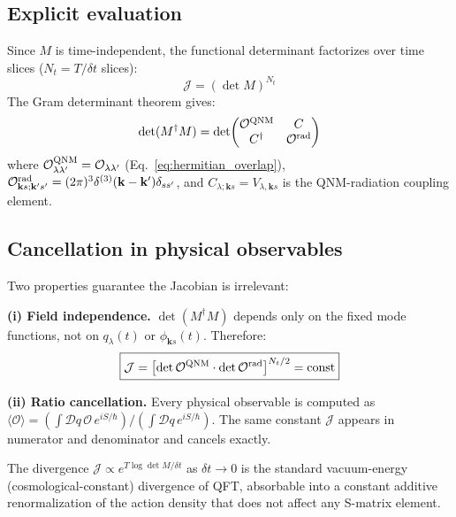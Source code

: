 \documentclass[12pt]{article}
\begin{document}
\subsection{Explicit evaluation}

Since $M$ is time-independent, the functional determinant factorizes
over time slices ($N_t=T/\delta t$ slices):
\begin{equation}
  \mathcal{J} = (\det M)^{N_t}
  \label{eq:jacobian_factored}
\end{equation}
The Gram determinant theorem gives:
\begin{equation}
  \det(M^\dagger M) = \det\!
  \begin{pmatrix}
  \mathcal{O}^{\rm QNM} & C\\
  C^\dagger & \mathcal{O}^{\rm rad}
  \end{pmatrix}
  \label{eq:gram_det}
\end{equation}
where $\mathcal{O}^{\rm QNM}_{\lambda\lambda'}=\mathcal{O}_{\lambda\lambda'}$
(Eq.~\ref{eq:hermitian_overlap}),
$\mathcal{O}^{\rm rad}_{\mathbf{k}s;\mathbf{k}'s'}=
(2\pi)^3\delta^{(3)}(\mathbf{k}-\mathbf{k}')\delta_{ss'}$,
and $C_{\lambda;\mathbf{k}s}=V_{\lambda,\mathbf{k}s}$ is the
QNM-radiation coupling element.

\subsection{Cancellation in physical observables}

Two properties guarantee the Jacobian is irrelevant:

\textbf{(i) Field independence.}  $\det(M^\dagger M)$ depends only on
the fixed mode functions, not on $q_\lambda(t)$ or $\phi_{\mathbf{k}s}(t)$.
Therefore:
\begin{equation}
  \boxed{\mathcal{J}=\bigl[\det\mathcal{O}^{\rm QNM}
  \cdot\det\mathcal{O}^{\rm rad}\bigr]^{N_t/2}=\text{const}}
  \label{eq:jacobian_const}
\end{equation}

\textbf{(ii) Ratio cancellation.}  Every physical observable is computed
as $\langle\mathcal{O}\rangle = (\int\mathcal{D}q\,\mathcal{O}\,e^{iS/\hbar})
/(\int\mathcal{D}q\,e^{iS/\hbar})$.  The same constant $\mathcal{J}$
appears in numerator and denominator and cancels exactly.

The divergence $\mathcal{J}\propto e^{T\log\det M/\delta t}$ as
$\delta t\to 0$ is the standard vacuum-energy (cosmological-constant)
divergence of QFT, absorbable into a constant additive renormalization
of the action density that does not affect any S-matrix element.
\end{document}
